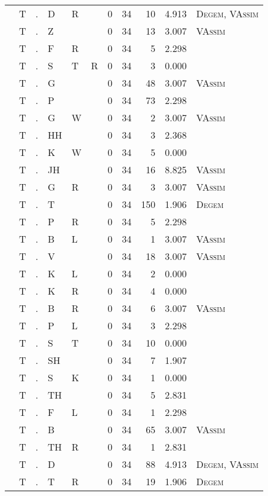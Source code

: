 \begin{longtable}{r@{ } r@{ } c@{ } l@{ } l@{ } l@{ } r r r r l }
 & T & . & D & R &  & 0 & 34 & 10 & 4.913 & \textsc{Degem}, \textsc{VAssim} \\
 & T & . & Z &  &  & 0 & 34 & 13 & 3.007 & \textsc{VAssim} \\
 & T & . & F & R &  & 0 & 34 & 5 & 2.298 &  \\
 & T & . & S & T & R & 0 & 34 & 3 & 0.000 &  \\
 & T & . & G &  &  & 0 & 34 & 48 & 3.007 & \textsc{VAssim} \\
 & T & . & P &  &  & 0 & 34 & 73 & 2.298 &  \\
 & T & . & G & W &  & 0 & 34 & 2 & 3.007 & \textsc{VAssim} \\
 & T & . & HH &  &  & 0 & 34 & 3 & 2.368 &  \\
 & T & . & K & W &  & 0 & 34 & 5 & 0.000 &  \\
 & T & . & JH &  &  & 0 & 34 & 16 & 8.825 & \textsc{VAssim} \\
 & T & . & G & R &  & 0 & 34 & 3 & 3.007 & \textsc{VAssim} \\
 & T & . & T &  &  & 0 & 34 & 150 & 1.906 & \textsc{Degem} \\
 & T & . & P & R &  & 0 & 34 & 5 & 2.298 &  \\
 & T & . & B & L &  & 0 & 34 & 1 & 3.007 & \textsc{VAssim} \\
 & T & . & V &  &  & 0 & 34 & 18 & 3.007 & \textsc{VAssim} \\
 & T & . & K & L &  & 0 & 34 & 2 & 0.000 &  \\
 & T & . & K & R &  & 0 & 34 & 4 & 0.000 &  \\
 & T & . & B & R &  & 0 & 34 & 6 & 3.007 & \textsc{VAssim} \\
 & T & . & P & L &  & 0 & 34 & 3 & 2.298 &  \\
 & T & . & S & T &  & 0 & 34 & 10 & 0.000 &  \\
 & T & . & SH &  &  & 0 & 34 & 7 & 1.907 &  \\
 & T & . & S & K &  & 0 & 34 & 1 & 0.000 &  \\
 & T & . & TH &  &  & 0 & 34 & 5 & 2.831 &  \\
 & T & . & F & L &  & 0 & 34 & 1 & 2.298 &  \\
 & T & . & B &  &  & 0 & 34 & 65 & 3.007 & \textsc{VAssim} \\
 & T & . & TH & R &  & 0 & 34 & 1 & 2.831 &  \\
 & T & . & D &  &  & 0 & 34 & 88 & 4.913 & \textsc{Degem}, \textsc{VAssim} \\
 & T & . & T & R &  & 0 & 34 & 19 & 1.906 & \textsc{Degem} \\

\end{longtable}

